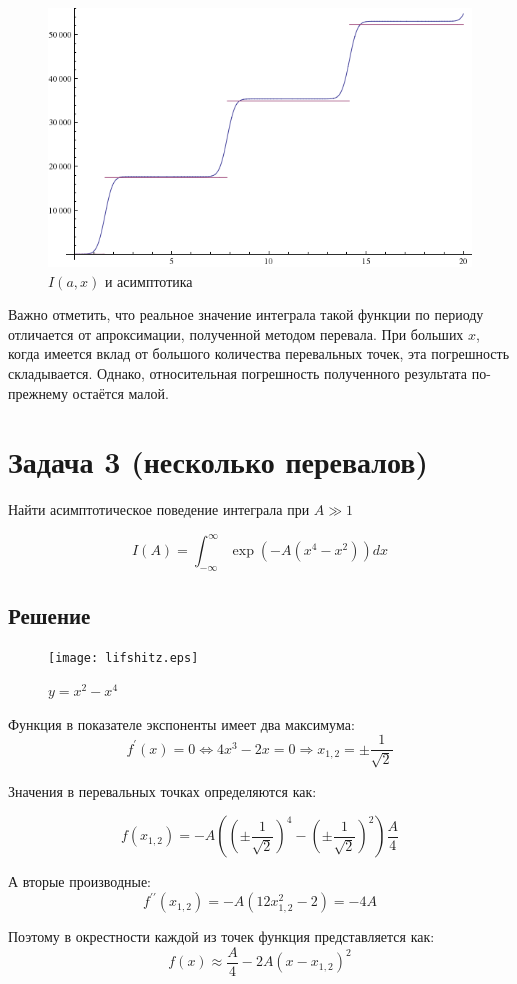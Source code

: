 \documentclass[a4paper,12pt]{article}
\begin{document}
\begin{figure}[h]
	\caption{$I(a,x)$ и асимптотика}
	\centering
	\includegraphics[width=0.5\columnwidth]{ladder.png}
\end{figure}

\noindent
Важно отметить, что реальное значение интеграла
такой функции по периоду отличается от апроксимации, полученной методом
перевала. При больших $x$, когда имеется вклад от большого количества
перевальных точек, эта погрешность складывается. Однако, относительная погрешность полученного результата по-прежнему остаётся малой.

\section*{Задача 3 (несколько перевалов)}

Найти асимптотическое поведение интеграла при $A\gg1$

\[
I(A)=\int_{-\infty}^{\infty}\exp(-A(x^{4}-x^{2}))dx
\]



\subsection*{Решение}

\begin{figure}[h]
	\caption{$y=x^{2}-x^{4}$}
	\centering
	\texttt{[image: lifshitz.eps]}
\end{figure}

\noindent
Функция в показателе экспоненты имеет два максимума: 
\[
f^{\prime}(x)=0\Leftrightarrow4x^{3}-2x=0\Rightarrow x_{1,2}=\pm\frac{1}{\sqrt{2}}
\]

\noindent
Значения в перевальных точках определяются как:

\[
f(x_{1,2})=-A\left(\left(\pm\frac{1}{\sqrt{2}}\right)^{4}-\left(\pm\frac{1}{\sqrt{2}}\right)^{2}\right)\frac{A}{4}
\]

\noindent
А вторые производные:
\[
f^{\prime\prime}(x_{1,2})=-A(12x_{1,2}^{2}-2)=-4A
\]

\noindent
Поэтому в окрестности каждой из точек функция представляется как:
\[
f(x)\approx\frac{A}{4}-2A(x-x_{1,2})^{2}
\]
\end{document}
